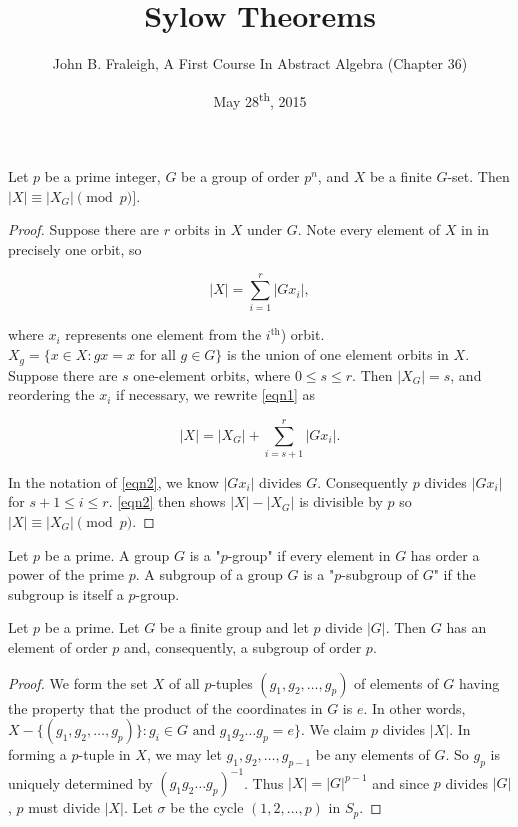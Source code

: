 \documentclass[a4paper,11pt]{article}
\title{Sylow Theorems}
\author{John B. Fraleigh, A First Course In Abstract Algebra (Chapter 36)}
\date{May 28\textsuperscript{th}, 2015}
\begin{document}
\maketitle
{}

\begin{outline}

    Let \(p\) be a prime integer, \(G\) be a group of order \(p^n\), and \(X\) be a finite \(G\)-set. Then 
    \(|X| \equiv |X_G| \pmod{p}]\).
    
    \begin{proof}
      Suppose there are \(r\) orbits in \(X\) under \(G\). Note every element of \(X\) in in precisely one orbit, so
      
      \begin{equation}
        \label{eqn1}
        |X| = \sum_{i=1}^{r} |Gx_i|, 
      \end{equation}
      
      where \(x_i\) represents one element from the \(i^{\text{th}}\)) orbit. \(X_{g} = \{x \in X: gx = x \text{ for all }
      g \in G\}\) is the union of one element orbits in \(X\). Suppose there are \(s\) one-element orbits, where \(0 \leq
      s \leq r\). Then \(|X_G| = s\), and reordering the \(x_i\) if necessary, we rewrite \eqref{eqn1} as 
      
      \begin{equation}
        \label{eqn2}
        |X| = |X_G| + \sum_{i=s+1}^r |Gx_i|.
      \end{equation}
      
      In the notation of \eqref{eqn2}, we know \(|Gx_i|\) divides \(G\). Consequently \(p\) divides \(|Gx_i|\) for
      \(s + 1 \leq i \leq r\). \eqref{eqn2} then shows \(|X| - |X_G|\) is divisible by \(p\) so \(|X| \equiv |X_G|
      \pmod{p}\).
    \end{proof}

    Let \(p\) be a prime. A group \(G\) is a "\(p\)-group" if every element in \(G\) has order a power
    of the prime \(p\). A subgroup of a group \(G\) is a "\(p\)-subgroup of \(G\)" if the subgroup is 
    itself a \(p\)-group.

    Let \(p\) be a prime. Let \(G\) be a finite group and let \(p\) divide \(|G|\). Then \(G\) has an 
    element of order \(p\) and, consequently, a subgroup of order \(p\).
    
    \begin{proof}
      We form the set \(X\) of all \(p\)-tuples \((g_1, g_2, \ldots, g_p)\) of elements of \(G\) having the property that
      the product of the coordinates in \(G\) is \(e\). In other words, \(X - \{(g_1, g_2, \ldots, g_p)\}: g_i \in G 
      \text{ and } g_1g_2\ldots g_p = e\}\). We claim \(p\) divides \(|X|\). In forming a \(p\)-tuple in \(X\), we may
      let \(g_1, g_2, \ldots, g_{p-1}\) be any elements of \(G\). So \(g_p\) is uniquely determined by \((g_1g_2 \ldots 
      g_p)^{-1}\). Thus \(|X| = |G|^{p-1}\) and since \(p\) divides \(|G|\), \(p\) must divide \(|X|\). Let \(\sigma\)
      be the cycle \((1, 2, \ldots, p)\) in \(S_p\).
      

\end{proof}
\end{outline}
\end{document}
